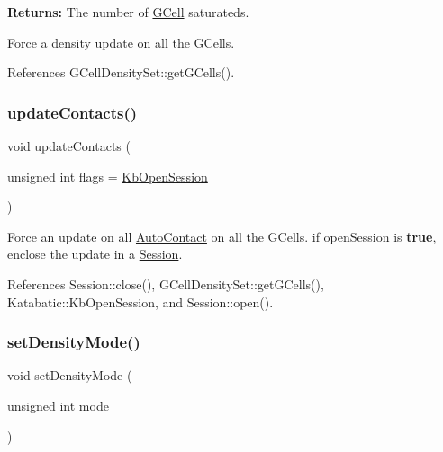 {\bfseries Returns\+:} The number of \hyperlink{classKatabatic_1_1GCell}{G\+Cell} saturateds.

Force a density update on all the G\+Cells. 

References G\+Cell\+Density\+Set\+::get\+G\+Cells().

\mbox{\label{classKatabatic_1_1GCellGrid_a032d6eb23f92e3a41a020d18c6bbc02d}} 
\subsubsection{\texorpdfstring{update\+Contacts()}{updateContacts()}}
{\footnotesize\ttfamily void update\+Contacts (\begin{DoxyParamCaption}\item[{unsigned int}]{flags = {\ttfamily \hyperlink{namespaceKatabatic_a2af2ad6b6441614038caf59d04b3b217af314588109fcc5f5ee1c42e5fd4d0ed5}{Kb\+Open\+Session}} }\end{DoxyParamCaption})}

Force an update on all \hyperlink{classKatabatic_1_1AutoContact}{Auto\+Contact} on all the G\+Cells. if {\ttfamily open\+Session} is {\bfseries true}, enclose the update in a \hyperlink{classKatabatic_1_1Session}{Session}. 

References Session\+::close(), G\+Cell\+Density\+Set\+::get\+G\+Cells(), Katabatic\+::\+Kb\+Open\+Session, and Session\+::open().

\mbox{\label{classKatabatic_1_1GCellGrid_a86899930041463cf80b713c3ca5b4834}} 
\subsubsection{\texorpdfstring{set\+Density\+Mode()}{setDensityMode()}}
{\footnotesize\ttfamily void set\+Density\+Mode (\begin{DoxyParamCaption}\item[{unsigned int}]{mode }\end{DoxyParamCaption})\hspace{0.3cm}{\ttfamily [inline]}}

